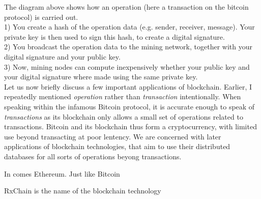 The diagram above shows how an operation (here a transaction on the bitcoin protocol) is carried out.\\
1) You create a hash of the operation data (e.g. sender, receiver, message). Your private key is then used to sign this hash,
to create a digital signature.\\
2) You broadcast the operation data to the mining network, together with your digital signature and your public key.\\
3) Now, mining nodes can compute inexpensively whether your public key and your digital signature where made using the same private key.\\


Let us now briefly discuss a few important applications of blockchain.
Earlier, I repeatedly mentioned \emph{operation} rather than \emph{transaction} intentionally.
When speaking within the infamous Bitcoin protocol, it is accurate enough to speak of \emph{transactions} as its blockchain
only allows a small set of operations related to transactions.
Bitcoin and its blockchain thus form a cryptocurrency, with limited use beyond transacting at poor lentency.
We are concerned with later applications of blockchain technologies, that aim to use their distributed databases for all sorts of operations
beyong transactions.

In comes Ethereum. Just like Bitcoin


RxChain is the name of the blockchain technology
